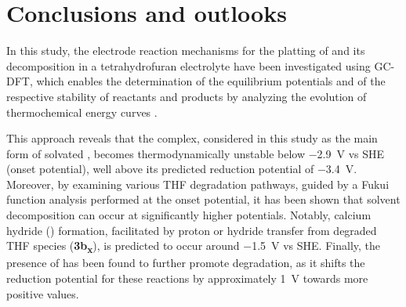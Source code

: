 \documentclass[twoside,twocolumn,9pt]{article}
\begin{document}
{\section{Conclusions and outlooks} \label{sec:ccls}

In this study, the electrode reaction mechanisms for the platting of  and its decomposition in a tetrahydrofuran electrolyte have been investigated using GC-DFT, which enables the determination of the equilibrium potentials and of the respective stability of reactants and products by analyzing the evolution of thermochemical energy curves \cite{baonguyenInvestigatingAbnormalConductivity2022}. 

This approach reveals that the  complex, considered in this study as the main form of solvated  \cite{hahnQuantifyingSpeciesPopulations2021}, becomes thermodynamically unstable below \SI{-2.9}{\volt} vs SHE (onset potential), well above its predicted reduction potential of \SI{-3.4}{\volt}. 
Moreover, by examining various THF degradation pathways, guided by a Fukui function analysis performed at the onset potential, it has been shown that solvent decomposition can occur at significantly higher potentials. 
Notably, calcium hydride () formation, facilitated by proton or hydride transfer from degraded THF species (\textbf{3b\textsubscript{x}}), is predicted to occur around \SI{-1.5}{\volt} vs SHE. 
Finally, the presence of  has been found to further promote degradation, as it shifts the reduction potential for these reactions by approximately \SI{1}{\volt} towards more positive values.

}
\end{document}
